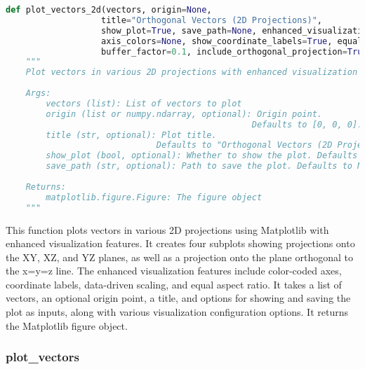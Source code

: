 \begin{lstlisting}[language=Python]
def plot_vectors_2d(vectors, origin=None, 
                   title="Orthogonal Vectors (2D Projections)", 
                   show_plot=True, save_path=None, enhanced_visualization=True,
                   axis_colors=None, show_coordinate_labels=True, equal_aspect_ratio=True,
                   buffer_factor=0.1, include_orthogonal_projection=True):
    """
    Plot vectors in various 2D projections with enhanced visualization features.
    
    Args:
        vectors (list): List of vectors to plot
        origin (list or numpy.ndarray, optional): Origin point. 
                                                 Defaults to [0, 0, 0].
        title (str, optional): Plot title. 
                              Defaults to "Orthogonal Vectors (2D Projections)".
        show_plot (bool, optional): Whether to show the plot. Defaults to True.
        save_path (str, optional): Path to save the plot. Defaults to None.
        
    Returns:
        matplotlib.figure.Figure: The figure object
    """
\end{lstlisting}

This function plots vectors in various 2D projections using Matplotlib with enhanced visualization features. It creates four subplots showing projections onto the XY, XZ, and YZ planes, as well as a projection onto the plane orthogonal to the x=y=z line. The enhanced visualization features include color-coded axes, coordinate labels, data-driven scaling, and equal aspect ratio. It takes a list of vectors, an optional origin point, a title, and options for showing and saving the plot as inputs, along with various visualization configuration options. It returns the Matplotlib figure object.

\subsubsection{plot\_vectors}

